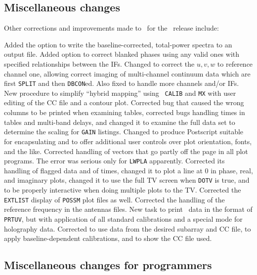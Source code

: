 \clearpage

\subsection{Miscellaneous changes}

Other corrections and improvements made to \AIPS\ for the
\RELEASENAME\ release include:
\begin{description}
 Added the option to write the baseline-corrected,
   total-power spectra to an output file.
 Added option to correct blanked phases using any valid
   ones with specified relationships between the IFs.
 Changed to correct the $u,v,w$ to reference channel
   one, allowing correct imaging of multi-channel continuum data which
   are first {\tt SPLIT} and then {\tt DBCON}ed.  Also fixed to handle
   more channels and/or IFs.
 New procedure to simplify ``hybrid mapping'' using {\tt
   CALIB} and {\tt MX} with user editing of the CC file and a contour
   plot.
 Corrected bug that caused the wrong columns to be
   printed when examining tables, corrected bugs handling times in
   tables and multi-band delays, and changed it to examine the full
   data set to determine the scaling for {\tt GAIN} listings.
 Changed to produce Postscript suitable for
   encapsulating and to offer additional user controls over plot
   orientation, fonts, and the like.  Corrected handling of vectors
   that go partly off the page in all plot programs.  The error was
   serious only for {\tt LWPLA} apparently.
 Corrected its handling of flagged data and of times,
   changed it to plot a line at 0 in phase, real, and imaginary plots,
   changed it to use the full TV screen when {\tt DOTV} is true, and
   to be properly interactive when doing multiple plots to the
   \hbox{TV}.  Corrected the {\tt EXTLIST} display of {\tt POSSM} plot
   files as well.
 Corrected the handling of the reference frequency in
   the antennas files.
 New task to print \uv\ data in the format of {\tt
   PRTUV}, but with application of all standard calibrations and a
   special mode for holography data.
 Corrected to use data from the desired subarray and CC
   file, to apply baseline-dependent calibrations, and to show the CC
   file used.
\end{description}

\subsection{Miscellaneous changes for programmers}

